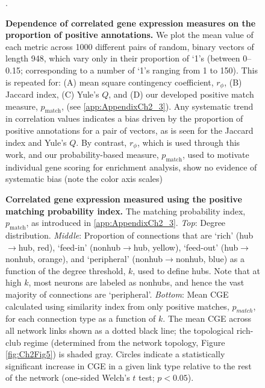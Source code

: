 \begin{figure}[h!]
 \caption{{\bf Dependence of correlated gene expression measures on the proportion of positive annotations.} We plot the mean value of each metric across 1000 different pairs of random, binary vectors of length 948, which vary only in their proportion of `1's (between 0--0.15; corresponding to a number of `1's ranging from 1 to 150).
This is repeated for:
(A) mean square contingency coefficient, $r_\phi$,
(B) Jaccard index,
(C) Yule's $Q$, and
(D) our developed positive match measure, $p_\mathrm{match}$, (see \ref{app:AppendixCh2_3}).
Any systematic trend in correlation values indicates a bias driven by the proportion of positive annotations for a pair of vectors, as is seen for the Jaccard index and Yule's $Q$.
By contrast, $r_\phi$, which is used through this work, and our probability-based measure, $p_\mathrm{match}$, used to motivate individual gene scoring for enrichment analysis, show no evidence of systematic bias (note the color axis scales)}.
\label{fig:Ch2S2_Fig}
\end{figure}


\begin{figure}[h!]
 \caption{{\bf Correlated gene expression measured using the positive matching probability index.} The matching probability index, $p_\mathrm{match}$, as introduced in \ref{app:AppendixCh2_3}.
\emph{Top}: Degree distribution.
\emph{Middle}: Proportion of connections that are `rich' (hub$\rightarrow$hub, red), `feed-in' (nonhub$\rightarrow$hub, yellow), `feed-out' (hub$\rightarrow$nonhub, orange), and `peripheral' (nonhub$\rightarrow$nonhub, blue) as a function of the degree threshold, $k$, used to define hubs.
Note that at high $k$, most neurons are labeled as nonhubs, and hence the vast majority of connections are `peripheral'.
\emph{Bottom}: Mean CGE calculated using similarity index from only positive matches, $p_{match}$, for each connection type as a function of $k$.
The mean CGE across all network links shown as a dotted black line; the topological rich-club regime (determined from the network topology, Figure \ref{fig:Ch2Fig5}) is shaded gray.
Circles indicate a statistically significant increase in CGE in a given link type relative to the rest of the network (one-sided Welch's $t$ test; $p < 0.05$).}
\label{fig:Ch2S3_Fig}
\end{figure}



